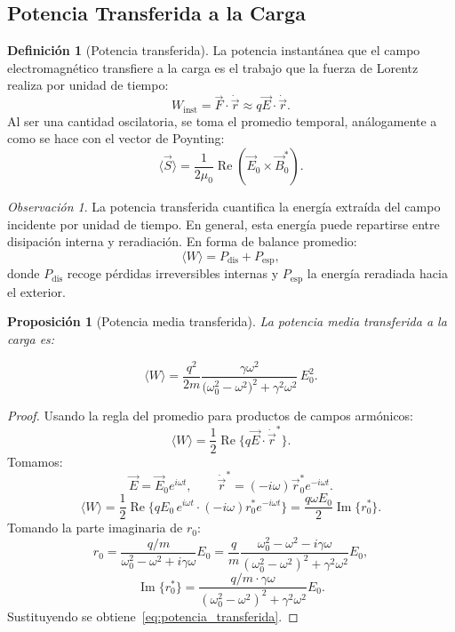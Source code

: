 \documentclass[12pt, a4paper]{article}
\theoremstyle{plain}
\newtheorem{proposicion}[teorema]{Proposición}
\theoremstyle{definition}
\newtheorem{definicion}[teorema]{Definición}
\theoremstyle{remark}
\newtheorem*{observacion}{Observación}
\newcommand{\ve}[1]{\vec{#1}}
\begin{document}
\subsection{Potencia Transferida a la Carga}

\begin{definicion}[Potencia transferida]
La potencia instantánea que el campo electromagnético transfiere a la carga
es el trabajo que la fuerza de Lorentz realiza por unidad de tiempo:
\[
  W_\text{inst} = \ve{F}\cdot\dot{\ve{r}} \approx q\ve{E}\cdot\dot{\ve{r}}.
\]
Al ser una cantidad oscilatoria, se toma el promedio temporal, análogamente
a como se hace con el vector de Poynting:
\[
  \langle\ve{S}\rangle = \frac{1}{2\mu_0}\operatorname{Re}(\ve{E}_0\times\ve{B}_0^*).
\]
\end{definicion}

\begin{observacion}
La potencia transferida cuantifica la energía extraída del campo incidente por
unidad de tiempo. En general, esta energía puede repartirse entre disipación
interna y reradiación. En forma de balance promedio:
\[
  \langle W\rangle = P_{\text{dis}} + P_{\text{esp}},
\]
donde $P_{\text{dis}}$ recoge pérdidas irreversibles internas y
$P_{\text{esp}}$ la energía reradiada hacia el exterior.
\end{observacion}

\begin{proposicion}[Potencia media transferida]
La potencia media transferida a la carga es:
\begin{mdframed}[style=resultado]
\begin{equation}
  \langle W\rangle = \frac{q^2}{2m}
  \frac{\gamma\omega^2}{\bigl(\omega_0^2-\omega^2\bigr)^2+\gamma^2\omega^2}
  \,E_0^2. \label{eq:potencia_transferida}
\end{equation}
\end{mdframed}
\end{proposicion}

\begin{proof}
Usando la regla del promedio para productos de campos armónicos:
\[
  \langle W\rangle = \frac{1}{2}\operatorname{Re}\{q\ve{E}\cdot\dot{\ve{r}}^*\}.
\]
Tomamos:
\[
  \ve{E} = \ve{E}_0 e^{i\omega t},
  \qquad
  \dot{\ve{r}}^* = (-i\omega)\ve{r}_0^* e^{-i\omega t}.
\]
\[
  \langle W\rangle = \frac{1}{2}\operatorname{Re}\{q E_0\,e^{i\omega t}
  \cdot(-i\omega) r_0^* e^{-i\omega t}\}
  = \frac{q\omega E_0}{2}\operatorname{Im}\{r_0^*\}.
\]
Tomando la parte imaginaria de $r_0$:
\[
  r_0=\frac{q/m}{\omega_0^2-\omega^2+i\gamma\omega}E_0
  =\frac{q}{m}\frac{\omega_0^2-\omega^2-i\gamma\omega}
    {(\omega_0^2-\omega^2)^2+\gamma^2\omega^2}E_0,
\]
\[
  \operatorname{Im}\{r_0^*\}
  = \frac{q/m\cdot\gamma\omega}{(\omega_0^2-\omega^2)^2+\gamma^2\omega^2}E_0.
\]
Sustituyendo se obtiene~\eqref{eq:potencia_transferida}.
\end{proof}
\end{document}
